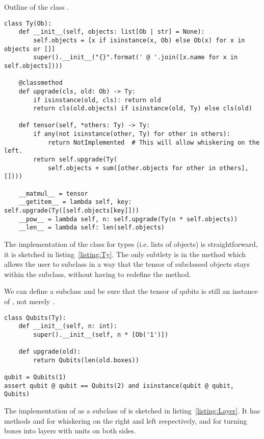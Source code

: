 \begin{python}\label{listing:Ty}
{\normalfont Outline of the class .}
\begin{verbatim}
class Ty(Ob):
    def __init__(self, objects: list[Ob | str] = None):
        self.objects = [x if isinstance(x, Ob) else Ob(x) for x in objects or []]
        super().__init__("{}".format(' @ '.join([x.name for x in self.objects])))

    @classmethod
    def upgrade(cls, old: Ob) -> Ty:
        if isinstance(old, cls): return old
        return cls(old.objects) if isinstance(old, Ty) else cls(old)

    def tensor(self, *others: Ty) -> Ty:
        if any(not isinstance(other, Ty) for other in others):
            return NotImplemented  # This will allow whiskering on the left.
        return self.upgrade(Ty(
            self.objects + sum([other.objects for other in others], [])))

    __matmul__ = tensor
    __getitem__ = lambda self, key: self.upgrade(Ty([self.objects[key]]))
    __pow__ = lambda self, n: self.upgrade(Ty(n * self.objects))
    __len__ = lambda self: len(self.objects)
\end{verbatim}
\end{python}

The implementation of the class  for types (i.e. lists of objects) is straightforward, it is sketched in listing~\ref{listing:Ty}.
The only subtlety is in the method  which allows the user to subclass  in a way that the tensor of subclassed objects stays within the subclass, without having to redefine the  method.

\begin{example}
We can define a  subclass and be sure that the tensor of qubits is still an instance of , not merely .
\begin{verbatim}
class Qubits(Ty):
    def __init__(self, n: int):
        super().__init__(self, n * [Ob('1')])

    def upgrade(old):
        return Qubits(len(old.boxes))

qubit = Qubits(1)
assert qubit @ qubit == Qubits(2) and isinstance(qubit @ qubit, Qubits)
\end{verbatim}
\end{example}

The implementation of  as a subclass of  is sketched in listing~\ref{listing:Layer}.
It has methods  and   for whiskering on the right and left respectively, and  for turning boxes into layers with units on both sides.

